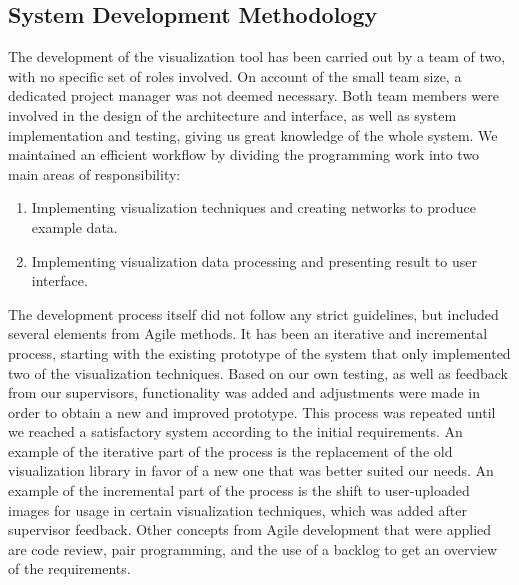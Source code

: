 \subsection{System Development Methodology}

The development of the visualization tool has been carried out by a team of two, with no specific set of roles involved. On account of the small team size, a dedicated project manager was not deemed necessary. Both team members were involved in the design of the architecture and interface, as well as system implementation and testing, giving us great knowledge of the whole system. We maintained an efficient workflow by dividing the programming work into two main areas of responsibility:
\begin{enumerate}
    \item Implementing visualization techniques and creating networks to produce example data.
    \item Implementing visualization data processing and presenting result to user interface.
\end{enumerate} %

\noindent The development process itself did not follow any strict guidelines, but included several elements from Agile methods. It has been an iterative and incremental process, starting with the existing prototype of the system that only implemented two of the visualization techniques. Based on our own testing, as well as feedback from our supervisors, functionality was added and adjustments were made in order to obtain a new and improved prototype. This process was repeated until we reached a satisfactory system according to the initial requirements. An example of the iterative part of the process is the replacement of the old visualization library in favor of a new one that was better suited our needs. An example of the incremental part of the process is the shift to user-uploaded images for usage in certain visualization techniques, which was added after supervisor feedback. Other concepts from Agile development that were applied are code review, pair programming, and the use of a backlog to get an overview of the requirements.

